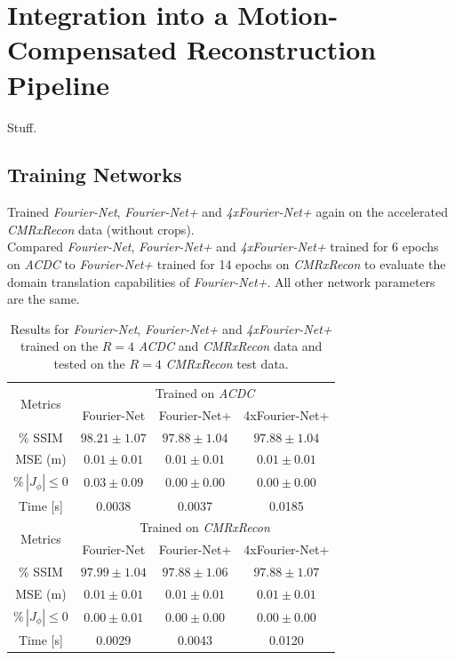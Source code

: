 \documentclass[english,version-2022-01]{uzl-thesis} %
\begin{document}
\section{Integration into a Motion-Compensated Reconstruction Pipeline} \label{Sec:ResultsIntegrationMotion-CompensatedReconstructionPipeline}
Stuff.

\subsection{Training Networks}
Trained \emph{Fourier-Net}, \emph{Fourier-Net+} and \emph{4xFourier-Net+} again on the accelerated \emph{CMRxRecon} data (without crops). \\
Compared \emph{Fourier-Net}, \emph{Fourier-Net+} and \emph{4xFourier-Net+} trained for 6 epochs on \emph{ACDC} to \emph{Fourier-Net+} trained for 14 epochs on \emph{CMRxRecon} to evaluate the domain translation capabilities of \emph{Fourier-Net+}. All other network parameters are the same.

\begin{table}[H] %
	\centering
	\caption{Results for \emph{Fourier-Net}, \emph{Fourier-Net+} and \emph{4xFourier-Net+} trained on the $R=4$ \emph{ACDC} and \emph{CMRxRecon} data and tested on the $R=4$ \emph{CMRxRecon} test data.}
	\label{tab:DomainTranslation_ACDC_CMRxRecon}
	\begin{tabular}{c c c c} %
		\toprule
		\multirow{2}{*}{Metrics} & \multicolumn{3}{c}{Trained on \emph{ACDC}} \\
		\cline{2-4} 
		 & Fourier-Net & Fourier-Net+ & 4xFourier-Net+\\	
		\midrule
		$\%$ SSIM & $98.21 \pm 1.07$ & $97.88 \pm 1.04$ & $97.88 \pm 1.04$\\
		MSE (m) & $0.01 \pm 0.01$ & $0.01 \pm 0.01$ & $0.01 \pm 0.01$ \\
		$\% \, |J_{\phi}|\leq0$ & $0.03 \pm 0.09$ & $0.00 \pm 0.00$ & $0.00 \pm 0.00$ \\
		Time [s] 	  & 0.0038 & 0.0037 & 0.0185  \\
		\midrule
		\multirow{2}{*}{Metrics} & \multicolumn{3}{c}{Trained on \emph{CMRxRecon}} \\
		\cline{2-4} 
		 & Fourier-Net & Fourier-Net+ & 4xFourier-Net+\\		
		\midrule
		$\%$ SSIM & $97.99 \pm 1.04$ & $97.88 \pm 1.06$ & $97.88 \pm 1.07$\\
		MSE (m) & $0.01 \pm 0.01$ & $0.01 \pm 0.01$ & $0.01 \pm 0.01$ \\
		$\% \, |J_{\phi}|\leq0$ & $0.00 \pm 0.01$ & $0.00 \pm 0.00$ & $0.00 \pm 0.00$ \\
		Time [s] 	  & 0.0029 & 0.0043 & 0.0120  \\
		\bottomrule
	\end{tabular}	
\end{table}
\end{document}

